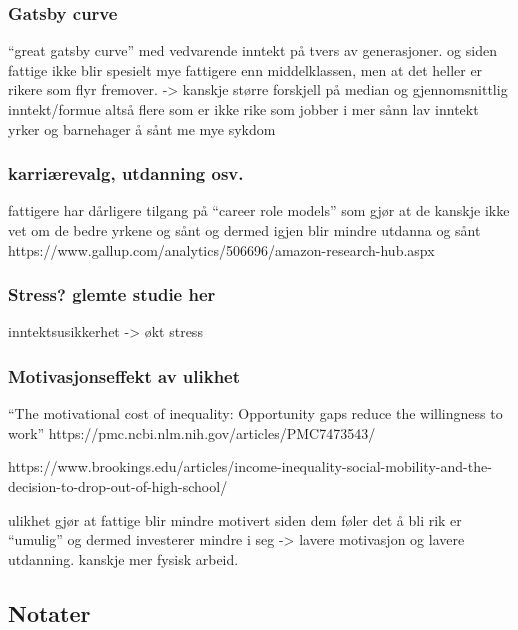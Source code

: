\documentclass[
  12pt,
  a4paper,
  DIV=11,
  numbers=noendperiod]{scrartcl}
\begin{document}
\subsubsection{Gatsby curve}\label{gatsby-curve}

``great gatsby curve'' med vedvarende inntekt på tvers av generasjoner.
og siden fattige ikke blir spesielt mye fattigere enn middelklassen, men
at det heller er rikere som flyr fremover. -\textgreater{} kanskje
større forskjell på median og gjennomsnittlig inntekt/formue altså flere
som er ikke rike som jobber i mer sånn lav inntekt yrker og barnehager å
sånt me mye sykdom

\subsubsection{karriærevalg, utdanning
osv.}\label{karriuxe6revalg-utdanning-osv.}

fattigere har dårligere tilgang på ``career role models'' som gjør at de
kanskje ikke vet om de bedre yrkene og sånt og dermed igjen blir mindre
utdanna og sånt
https://www.gallup.com/analytics/506696/amazon-research-hub.aspx

\subsubsection{Stress? glemte studie
her}\label{stress-glemte-studie-her}

inntektsusikkerhet -\textgreater{} økt stress

\subsubsection{Motivasjonseffekt av
ulikhet}\label{motivasjonseffekt-av-ulikhet}

``The motivational cost of inequality: Opportunity gaps reduce the
willingness to work'' https://pmc.ncbi.nlm.nih.gov/articles/PMC7473543/

https://www.brookings.edu/articles/income-inequality-social-mobility-and-the-decision-to-drop-out-of-high-school/

ulikhet gjør at fattige blir mindre motivert siden dem føler det å bli
rik er ``umulig'' og dermed investerer mindre i seg -\textgreater{}
lavere motivasjon og lavere utdanning. kanskje mer fysisk arbeid.

\subsection{Notater}\label{notater-2}
\end{document}
